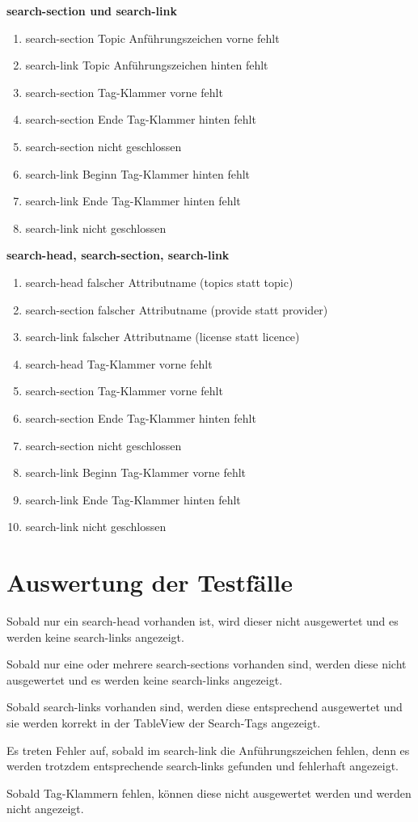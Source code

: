\textbf{search-section und search-link} 
\begin{enumerate}
\item search-section Topic Anführungszeichen vorne fehlt
\item search-link Topic Anführungszeichen hinten fehlt
\item search-section Tag-Klammer vorne fehlt
\item search-section Ende  Tag-Klammer hinten fehlt
\item search-section nicht geschlossen
\item search-link Beginn Tag-Klammer hinten fehlt
\item search-link Ende  Tag-Klammer hinten fehlt
\item search-link nicht geschlossen
\end{enumerate}

\textbf{search-head, search-section, search-link}

\begin{enumerate}
\item search-head falscher Attributname (topics statt topic)
\item search-section falscher Attributname (provide statt provider)
\item search-link falscher Attributname (license statt licence)
\item search-head Tag-Klammer vorne fehlt
\item search-section Tag-Klammer vorne fehlt
\item search-section Ende  Tag-Klammer hinten fehlt
\item search-section nicht geschlossen
\item search-link Beginn Tag-Klammer vorne fehlt
\item search-link Ende  Tag-Klammer hinten fehlt
\item search-link nicht geschlossen
\end{enumerate}

\section{Auswertung der Testfälle}

Sobald nur ein search-head vorhanden ist, wird dieser nicht ausgewertet und es werden keine search-links angezeigt.

Sobald nur eine oder mehrere search-sections vorhanden sind, werden diese nicht ausgewertet und es werden keine search-links angezeigt.

Sobald search-links vorhanden sind, werden diese entsprechend ausgewertet und sie werden korrekt in der TableView der Search-Tags angezeigt.

Es treten Fehler auf, sobald im search-link die Anführungszeichen fehlen, denn es werden trotzdem entsprechende search-links gefunden und fehlerhaft angezeigt.

Sobald Tag-Klammern fehlen, können diese nicht ausgewertet werden und werden nicht angezeigt.